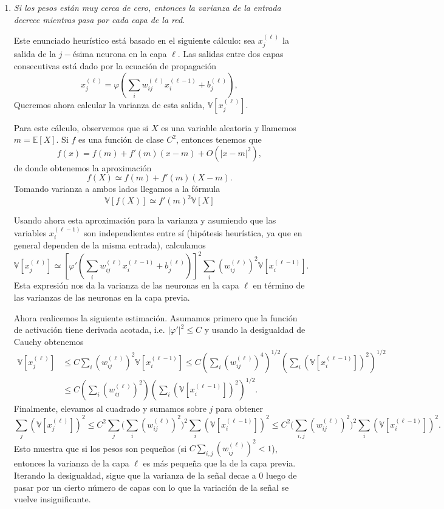 \documentclass[12pt, a4paper]{amsbook}
\newcommand{\E}{{\mathbb E}}
\newcommand{\V}{{\mathbb V}}
\theoremstyle{remark}
\theoremstyle{definition}
\numberwithin{section}{chapter}
\numberwithin{subsection}{section}
\numberwithin{equation}{section}
\numberwithin{figure}{chapter}
\begin{document}
\begin{enumerate}
\item {\em Si los pesos están muy cerca de cero, entonces la varianza de la entrada decrece mientras pasa por cada capa de la red}.

Este enunciado heurístico está basado en el siguiente cálculo: sea $x_j^{(\ell)}$ la salida de la $j-$ésima neurona en la capa $\ell$. Las salidas entre dos capas consecutivas está dado por la ecuación de propagación
$$
x_j^{(\ell)} = \varphi\left(\sum_i w_{ij}^{(\ell)} x_i^{(\ell-1)} + b_j^{(\ell)}\right),
$$
Queremos ahora calcular la varianza de esta salida, $\V[x_j^{(\ell)}]$.

Para este cálculo, observemos que si $X$ es una variable aleatoria y llamemos $m=\E[X]$. Si $f$ es una función de clase $C^2$, entonces tenemos que
$$
f(x) = f(m) + f'(m) (x-m) + O(|x-m|^2),
$$
de donde obtenemos la aproximación
$$
f(X) \simeq f(m) + f'(m)(X-m).
$$
Tomando varianza a ambos lados llegamos a la fórmula
\begin{equation}\label{var}
\V[f(X)] \simeq f'(m)^2 \V[X]
\end{equation}

Usando ahora esta aproximación para la varianza y asumiendo que las variables $x_i^{(\ell-1)}$ son independientes entre sí (hipótesis heurística, ya que en general dependen de la misma entrada), calculamos
$$
\V[x_j^{(\ell)}] \simeq \left[\varphi'\left(\sum_i w_{ij}^{(\ell)} x_i^{(\ell-1)} + b_j^{(\ell)}\right)\right]^2 \sum_i \left(w_{ij}^{(\ell)}\right)^2 \V[x_i^{(\ell-1)}].
$$
Esta expresión nos da la varianza de las neuronas en la capa $\ell$ en término de las varianzas de las neuronas en la capa previa.

Ahora realicemos la siguiente estimación. Asumamos primero que la función de activación tiene derivada acotada, i.e. $|\varphi'|^2\le C$ y usando la desigualdad de Cauchy obtenemos
$$
\begin{aligned}\V[x_j^{(\ell)}]&\le C\sum_i (w_{ij}^{(\ell)})^2 \V[x_i^{(\ell-1)}]\le C \left(\sum_i (w_{ij}^{(\ell)})^4\right)^{1/2} \left(\sum_i (\V[x_i^{(\ell-1)}])^2\right)^{1/2}\\&\le C \left(\sum_i (w_{ij}^{(\ell)})^2\right) \left(\sum_i (\V[x_i^{(\ell-1)}])^2\right)^{1/2}.\end{aligned}
$$
Finalmente, elevamos al cuadrado y sumamos sobre $j$ para obtener
$$
\sum_j(\V[x_j^{(\ell)}])^2 \le C^2 \sum_j\Big(\sum_i (w_{ij}^{(\ell)})^2\Big)^2 \sum_i (\V[x_i^{(\ell-1)}])^2\le C^2 \Big(\sum_{i,j} (w_{ij}^{(\ell)})^2\Big)^2 \sum_i (\V[x_i^{(\ell-1)}])^2.
$$
Esto muestra que si los pesos son pequeños (si $C\sum_{i,j}(w_{ij}^{(\ell)})^2<1$), entonces la varianza de la capa $\ell$ es más pequeña que la de la capa previa. Iterando la desigualdad, sigue que la varianza de la señal decae a 0 luego de pasar por un cierto número de capas con lo que la variación de la señal se vuelve insignificante.


\end{enumerate}
\end{document}
